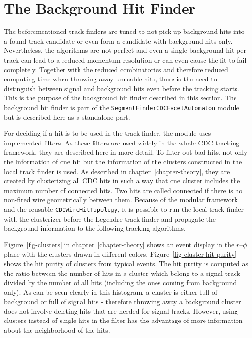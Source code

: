 \section{The Background Hit Finder} \label{section-background}
The beforementioned track finders are tuned to not pick up background hits into a found track candidate or even form a candidate with background hits only. Nevertheless, the algorithms are not perfect and even a single background hit per track can lead to a reduced momentum resolution or can even cause the fit to fail completely. Together with the reduced combinatorics and therefore reduced computing time when throwing away unusable hits, there is the need to distinguish between signal and background hits even before the tracking starts. This is the purpose of the background hit finder described in this section. The background hit finder is part of the \texttt{SegmentFinderCDCFacetAutomaton} module but is described here as a standalone part.

For deciding if a hit is to be used in the track finder, the module uses implemented filters. As these filters are used widely in the whole CDC tracking framework, they are described here in more detail. To filter out bad hits, not only the information of one hit but the information of the clusters constructed in the local track finder is used. As described in chapter~\ref{chapter-theory}, they are created by clusterizing all CDC hits in such a way that one cluster includes the maximum number of connected hits. Two hits are called connected if there is no non-fired wire geometrically between them. Because of the modular framework and the reusable \texttt{CDCWireHitTopology}, it is possible to run the local track finder with the clusterizer before the Legendre track finder and propagate the background information to the following tracking algorithms. 

Figure~\ref{fig-clusters} in chapter~\ref{chapter-theory} shows an event display in the $r$--$\phi$ plane with the clusters drawn in different colors. Figure~\ref{fig-cluster-hit-purity} shows the hit purity of clusters from typical events. The hit purity is computed as the ratio between the number of hits in a cluster which belong to a signal track divided by the number of all hits (including the ones coming from background only). As can be seen clearly in this histogram, a cluster is either full of background or full of signal hits - therefore throwing away a background cluster does not involve deleting hits that are needed for signal tracks. However, using clusters instead of single hits in the filter has the advantage of more information about the neighborhood of the hits.

